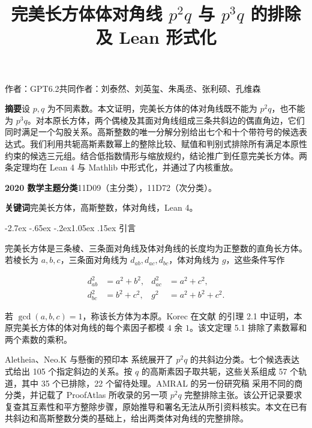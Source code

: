 \documentclass[11pt,a4paper,twoside]{article}
\makeatletter
\numberwithin{equation}{section}
\newcommand{\paperauthors}{作者：GPT6.2\qquad 共同作者：刘泰然、刘英玺、朱禹丞、张利硕、孔维森}
\newcommand{\paperaffiliation}{}
\newcommand{\paperstatus}{预印本\enspace·\enspace 2026 年 11 月 21 日}
\renewcommand{\section}{\@startsection{section}{1}{\z@}%
  {-2.7ex \@plus -.65ex \@minus -.2ex}{1.05ex \@plus .15ex}%
  {\normalfont\large\bfseries}}
\renewcommand{\maketitle}{%
  \thispagestyle{plain}%
  \begin{center}
    {\LARGE\bfseries\@title\par}
    \ifx\paperauthors\@empty\else
      \vspace{.8em}{\large\paperauthors\par}
    \fi
    \ifx\paperaffiliation\@empty\else
      \vspace{.2em}{\small\paperaffiliation\par}
    \fi
    \vspace{.65em}{\small\paperstatus\par}
  \end{center}
  \vspace{.45em}
}
\newenvironment{paperabstract}{%
  \begin{list}{}{\setlength{\leftmargin}{6mm}\setlength{\rightmargin}{6mm}%
    \setlength{\topsep}{0pt}\setlength{\parsep}{0pt}}%
  \item\normalsize\ignorespaces
}{\end{list}\vspace{.45em}}
\newcommand{\frontfield}[2]{\par\noindent\textbf{#1}\enspace #2}
\makeatother
\begin{document}
\title{完美长方体体对角线 \(p^2q\) 与 \(p^3q\) 的排除\\及 Lean 形式化}
\maketitle
\begin{paperabstract}
\frontfield{摘要}{设 \(p,q\) 为不同素数。本文证明，完美长方体的体对角线既不能为 \(p^2q\)，也不能为 \(p^3q\)。对本原长方体，两个偶棱及其面对角线组成三条共斜边的偶直角边，它们同时满足一个勾股关系。高斯整数的唯一分解分别给出七个和十个带符号的候选表达式。我们利用共轭高斯素数幂上的整除比较、赋值和判别式排除所有满足本原性约束的候选三元组。结合低指数情形与缩放规约，结论推广到任意完美长方体。两条定理均在 Lean 4 与 Mathlib 中形式化，并通过了内核重放。}
\smallskip
\frontfield{2020 数学主题分类}{11D09（主分类），11D72（次分类）。}
\frontfield{关键词}{完美长方体，高斯整数，体对角线，Lean 4。}
\end{paperabstract}

\section{引言}
\label{sec:introduction}

完美长方体是三条棱、三条面对角线及体对角线的长度均为正整数的直角长方体。若棱长为 \(a,b,c\)，三条面对角线为 \(d_{ab},d_{ac},d_{bc}\)，体对角线为 \(g\)，这些条件写作

\begin{equation}\label{eq:cuboid}
\begin{aligned}
d_{ab}^2&=a^2+b^2,& d_{ac}^2&=a^2+c^2,\\
d_{bc}^2&=b^2+c^2,& g^2&=a^2+b^2+c^2.
\end{aligned}
\end{equation}

若 \(\gcd(a,b,c)=1\)，称该长方体为本原。Korec 在文献 \cite{ref1} 的引理 2.1 中证明，本原完美长方体的体对角线的每个素因子都模 \(4\) 余 \(1\)。该文定理 5.1 排除了素数幂和两个素数的乘积。

Aletheia、Neo.K 与懸衡的预印本 \cite{ref2} 系统展开了 \(p^2q\) 的共斜边分类。七个候选表达式给出 105 个指定斜边的关系。按 \(q\) 的高斯素因子取共轭，这些关系组成 57 个轨道，其中 35 个已排除，22 个留待处理。AMRAL 的另一份研究稿 \cite{ref3} 采用不同的商分类，并记载了 ProofAtlas \cite{ref4} 所收录的另一项 \(p^2q\) 完整排除主张。该公开记录要求复查其互素性和平方整除步骤，原始推导和署名无法从所引资料核实。本文在已有共斜边和高斯整数分类的基础上，给出两类体对角线的完整排除。
\end{document}
